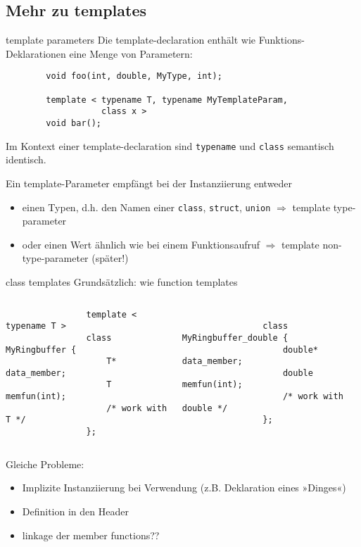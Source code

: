 \subsection{Mehr zu templates}

\begin{frame}[fragile]{template parameters}
	Die template-declaration enthält wie Funktions-Deklarationen eine Menge von Parametern:
	\begin{lstlisting}
		void foo(int, double, MyType, int);
		
		template < typename T, typename MyTemplateParam,
		           class x >
		void bar();
	\end{lstlisting}
	
	Im Kontext einer template-declaration sind \verb|typename| und \verb|class| semantisch identisch.
	
	\pause
	
	Ein template-Parameter empfängt bei der Instanziierung entweder
	\begin{itemize}
		\item einen Typen, d.h. den Namen einer \verb|class|, \verb|struct|, \verb|union| $\Rightarrow$ template type-parameter
		\item oder einen Wert ähnlich wie bei einem Funktionsaufruf $\Rightarrow$ template non-type-parameter \alert{(später!)}
	\end{itemize}
\end{frame}

\begin{frame}[fragile]{class templates}
	Grundsätzlich: wie function templates
	
	\begin{columns}
			\begin{lstlisting}
				template < typename T >
				class MyRingbuffer {
				    T* data_member;
				    T memfun(int);
				    /* work with T */
				};
			\end{lstlisting}
			
			\begin{lstlisting}
				
				class MyRingbuffer_double {
				    double* data_member;
				    double memfun(int);
				    /* work with double */
				};
			\end{lstlisting}
	\end{columns}
	
	\pause
	\vspace{1em}
	
	Gleiche Probleme:
	\begin{itemize}
		\item Implizite Instanziierung bei Verwendung (z.B. Deklaration eines »Dinges«)
		\item Definition in den Header
		\item linkage der member functions??
	\end{itemize}
\end{frame}

